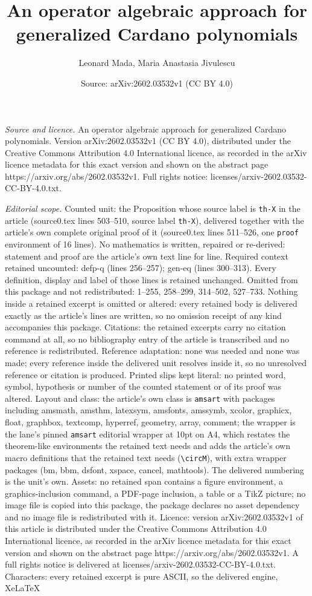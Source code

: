 \documentclass[10pt,a4paper]{amsart}
\title[An operator algebraic approach for generalized Cardano polyn]{An operator algebraic approach for generalized Cardano polynomials}
\author{Leonard Mada, Maria Anastasia Jivulescu}
\date{Source: arXiv:2602.03532v1 (CC BY 4.0)}
\begin{document}
\maketitle

\noindent\emph{Source and licence.} An operator algebraic approach for generalized Cardano polynomials. Version arXiv:2602.03532v1 (CC BY 4.0), distributed under the Creative Commons Attribution 4.0 International licence, as recorded in the arXiv licence metadata for this exact version and shown on the abstract page https://arxiv.org/abs/2602.03532v1. Full rights notice: licenses/arxiv-2602.03532-CC-BY-4.0.txt.\par\smallskip

\noindent\textit{Editorial scope.} Counted unit: the Proposition whose source label is \texttt{th-X} in the article (source0.tex lines 503--510, source label \texttt{th-X}), delivered together with the article's own complete original proof of it (source0.tex lines 511--526, one \texttt{proof} environment of 16 lines). No mathematics is written, repaired or re-derived: statement and proof are the article's own text line for line. Required context retained uncounted: defp-q (lines 256--257); gen-eq (lines 300--313). Every definition, display and label of those lines is retained unchanged. Omitted from this package and not redistributed: 1--255, 258--299, 314--502, 527--733. Nothing inside a retained excerpt is omitted or altered: every retained body is delivered exactly as the article's lines are written, so no omission receipt of any kind accompanies this package. Citations: the retained excerpts carry no citation command at all, so no bibliography entry of the article is transcribed and no reference is redistributed. Reference adaptation: none was needed and none was made; every reference inside the delivered unit resolves inside it, so no unresolved reference or citation is produced. Printed slips kept literal: no printed word, symbol, hypothesis or number of the counted statement or of its proof was altered. Layout and class: the article's own class is \texttt{amsart} with packages including amsmath, amsthm, latexsym, amsfonts, amssymb, xcolor, graphicx, float, graphbox, textcomp, hyperref, geometry, array, comment; the wrapper is the lane's pinned \texttt{amsart} editorial wrapper at 10pt on A4, which restates the theorem-like environments the retained text needs and adds the article's own macro definitions that the retained text needs (\texttt{\textbackslash circM}), with extra wrapper packages (bm, bbm, dsfont, xspace, cancel, mathtools). The delivered numbering is the unit's own. Assets: no retained span contains a figure environment, a graphics-inclusion command, a PDF-page inclusion, a table or a TikZ picture; no image file is copied into this package, the package declares no asset dependency and no image file is redistributed with it. Licence: version arXiv:2602.03532v1 of this article is distributed under the Creative Commons Attribution 4.0 International licence, as recorded in the arXiv licence metadata for this exact version and shown on the abstract page https://arxiv.org/abs/2602.03532v1. A full rights notice is delivered at licenses/arxiv-2602.03532-CC-BY-4.0.txt. Characters: every retained excerpt is pure ASCII, so the delivered engine, XeLaTeX 
\end{document}
